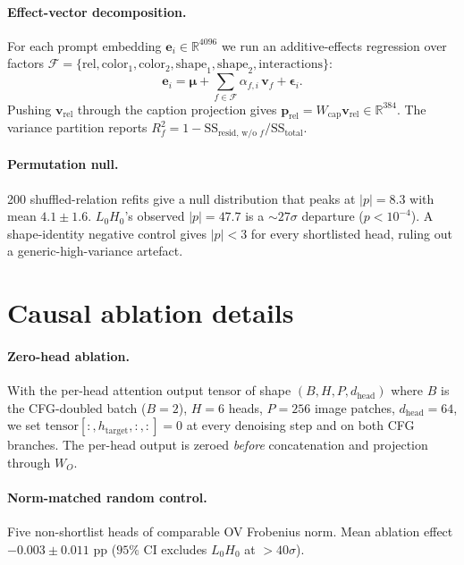 \documentclass{article}
\theoremstyle{plain}
\theoremstyle{definition}
\begin{document}
\paragraph{Effect-vector decomposition.} For each prompt embedding $\mathbf{e}_i\in\mathbb{R}^{4096}$ we run an additive-effects regression over factors $\mathcal{F}\!=\!\{\text{rel},\text{color}_1,\text{color}_2,\text{shape}_1,\text{shape}_2,\text{interactions}\}$:
\begin{equation}
\mathbf{e}_i = \boldsymbol{\mu} + \sum_{f\in\mathcal{F}} \alpha_{f,i}\,\mathbf{v}_f + \boldsymbol{\epsilon}_i.
\end{equation}
Pushing $\mathbf{v}_\text{rel}$ through the caption projection gives $\mathbf{p}_\text{rel} = W_\text{cap}\mathbf{v}_\text{rel} \in \mathbb{R}^{384}$. The variance partition reports $R^2_f = 1 - \mathrm{SS}_\text{resid, w/o $f$}/\mathrm{SS}_\text{total}$.

\paragraph{Permutation null.} 200 shuffled-relation refits give a null distribution that peaks at $|p|\!=\!8.3$ with mean $4.1\pm 1.6$. $L_0H_0$'s observed $|p|\!=\!47.7$ is a $\sim\!27\sigma$ departure ($p\!<\!10^{-4}$). A shape-identity negative control gives $|p|\!<\!3$ for every shortlisted head, ruling out a generic-high-variance artefact.

\section{Causal ablation details}
\label{app:ablation}

\paragraph{Zero-head ablation.} With the per-head attention output tensor of shape $(B, H, P, d_\text{head})$ where $B$ is the CFG-doubled batch ($B{=}2$), $H{=}6$ heads, $P{=}256$ image patches, $d_\text{head}{=}64$, we set $\text{tensor}[:, h_\text{target}, :, :] = 0$ at every denoising step and on both CFG branches. The per-head output is zeroed \emph{before} concatenation and projection through $W_O$.

\paragraph{Norm-matched random control.} Five non-shortlist heads of comparable OV Frobenius norm. Mean ablation effect $-0.003 \pm 0.011$ pp ($95\%$ CI excludes $L_0H_0$ at $> 40\sigma$).
\end{document}
